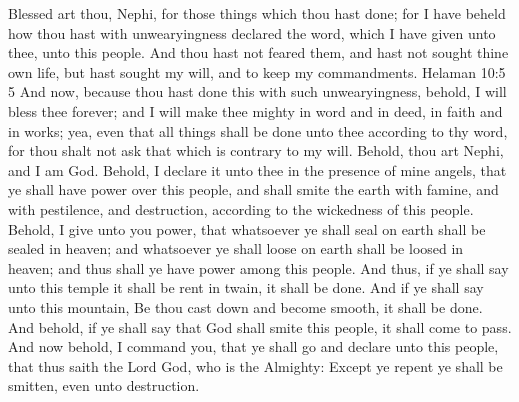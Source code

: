 Blessed art thou, Nephi, for those things which thou hast done; for I have beheld how thou hast with unwearyingness declared the word, which I have given unto thee, unto this people. And thou hast not feared them, and hast not sought thine own life, but hast sought my will, and to keep my commandments.  Helaman 10:5 5 And now, because thou hast done this with such unwearyingness, behold, I will bless thee forever; and I will make thee mighty in word and in deed, in faith and in works; yea, even that all things shall be done unto thee according to thy word, for thou shalt not ask that which is contrary to my will.
\bverse \iffalse Behold, thou art Nephi, and I am God. Behold, I declare it unto thee in the presence of mine angels, that ye shall have power over this people, and shall smite the earth with famine, and with pestilence, and destruction, according to the wickedness of this people. \fi
Behold, thou art Nephi, and I am God. Behold, I declare it unto thee in the presence of mine angels, that ye shall have power over this people, and shall smite the earth with famine, and with pestilence, and destruction, according to the wickedness of this people.
\bverse \iffalse Behold, I give unto you power, that whatsoever ye shall seal on earth shall be sealed in heaven; and whatsoever ye shall loose on earth shall be loosed in heaven; and thus shall ye have power among this people. \fi
Behold, I give unto you power, that whatsoever ye shall seal on earth shall be sealed in heaven; and whatsoever ye shall loose on earth shall be loosed in heaven; and thus shall ye have power among this people.
\bverse \iffalse And thus, if ye shall say unto this temple it shall be rent in twain, it shall be done. \fi
And thus, if ye shall say unto this temple it shall be rent in twain, it shall be done.
\bverse \iffalse And if ye shall say unto this mountain, Be thou cast down and become smooth, it shall be done. \fi
And if ye shall say unto this mountain, Be thou cast down and become smooth, it shall be done.
\bverse \iffalse And behold, if ye shall say that God shall smite this people, it shall come to pass. \fi
And behold, if ye shall say that God shall smite this people, it shall come to pass.
\bverse \iffalse And now behold, I command you, that ye shall go and declare unto this people, that thus saith the Lord God, who is the Almighty: Except ye repent ye shall be smitten, even unto destruction. \fi
And now behold, I command you, that ye shall go and declare unto this people, that thus saith the Lord God, who is the Almighty: Except ye repent ye shall be smitten, even unto destruction.
